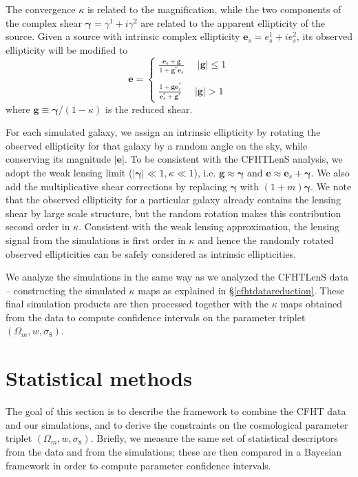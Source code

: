 \documentclass[reprint,aps,prd,superscriptaddress,showkeys,showpacs]{revtex4-1}
\begin{document}
The convergence $\kappa$ is related to
the magnification, while the two components of the complex shear
$\pmb{\gamma}=\gamma^1 + i\gamma^2$ are related to the apparent
ellipticity of the source. Given a source with intrinsic complex
ellipticity $\mathbf{e}_s=e^1_s + ie^2_s$, its observed ellipticity
will be modified to
\begin{equation}
\mathbf{e} = 
\begin{cases}
\frac{\mathbf{e}_s+\mathbf{g}}{1+\mathbf{g}^*\mathbf{e}_s} \,\,\,\,\,\,\,\, \vert \mathbf{g}\vert \leq 1 \\ \\
\frac{1+\mathbf{ge}_s^*}{\mathbf{e}_s^* + \mathbf{g}^*} \,\,\,\,\,\,\,\, \vert \mathbf{g}\vert > 1
\end{cases}
\end{equation}
where $\mathbf{g} \equiv \pmb{\gamma}/(1-\kappa)$ is the reduced shear. 

For each simulated galaxy, we assign an intrinsic ellipticity by
rotating the observed ellipticity for that galaxy by a random angle on
the sky, while conserving its magnitude $\vert\mathbf{e}\vert$. To be
consistent with the CFHTLenS analysis, we adopt the weak lensing limit
($\vert\pmb{\gamma}\vert\ll1,\kappa\ll1$), i.e.
$\mathbf{g}\approx\pmb{\gamma}$ and $\mathbf{e}\approx
\mathbf{e}_s+\pmb{\gamma}$. We also add the multiplicative shear
corrections by replacing $\pmb{\gamma}$ with $(1+m)\pmb{\gamma}$. We
note that the observed ellipticity for a particular galaxy already
contains the lensing shear by large scale structure, but the random
rotation makes this contribution second order in $\kappa$. Consistent
with the weak lensing approximation, the lensing signal from the
simulations is first order in $\kappa$ and hence the randomly rotated
observed ellipticities can be safely considered as intrinsic
ellipticities. 

We analyze the simulations in the same way as we analyzed the CFHTLenS
data -- constructing the simulated $\kappa$ maps as explained in
\S\ref{cfhtdatareduction}. These final simulation products are then
processed together with the $\kappa$ maps obtained from the data to
compute confidence intervals on the parameter triplet
$(\Omega_m,w,\sigma_8)$.



\section{Statistical methods}

The goal of this section is to describe the framework to combine the
CFHT data and our simulations, and to derive the constraints on the
cosmological parameter triplet $(\Omega_m,w,\sigma_8)$. Briefly, we
measure the same set of statistical descriptors from the data and from the
simulations; these are then compared in a Bayesian framework in
order to compute parameter confidence intervals.
\end{document}
